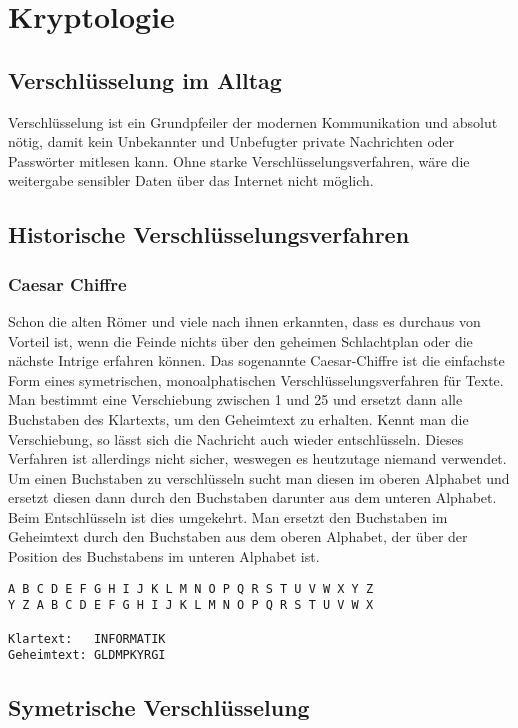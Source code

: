 \section{Kryptologie}
\subsection{Verschlüsselung im Alltag}

Verschlüsselung ist ein Grundpfeiler der modernen Kommunikation und absolut nötig,
damit kein Unbekannter und Unbefugter private Nachrichten oder Passwörter mitlesen
kann. Ohne starke Verschlüsselungsverfahren, wäre die weitergabe sensibler Daten über
das Internet nicht möglich.

\subsection{Historische Verschlüsselungsverfahren}

\subsubsection{Caesar Chiffre}

Schon die alten Römer und viele nach ihnen erkannten, dass es durchaus von Vorteil
ist, wenn die Feinde nichts über den geheimen Schlachtplan oder die nächste Intrige
erfahren können.
Das sogenannte Caesar-Chiffre ist die einfachste Form eines symetrischen,
monoalphatischen Verschlüsselungsverfahren für Texte.
Man bestimmt eine Verschiebung zwischen 1 und 25 und ersetzt dann
alle Buchstaben des Klartexts, um den Geheimtext zu erhalten.
Kennt man die Verschiebung, so lässt sich die Nachricht auch wieder entschlüsseln.
Dieses Verfahren ist allerdings nicht sicher, weswegen es heutzutage niemand verwendet.
Um einen Buchstaben zu verschlüsseln sucht man diesen im oberen Alphabet und
ersetzt diesen dann durch den Buchstaben darunter aus dem unteren Alphabet.
Beim Entschlüsseln ist dies umgekehrt. Man ersetzt den Buchstaben im Geheimtext
durch den Buchstaben aus dem oberen Alphabet, der über der Position des Buchstabens
im unteren Alphabet ist.

\begin{lstlisting}
A B C D E F G H I J K L M N O P Q R S T U V W X Y Z
Y Z A B C D E F G H I J K L M N O P Q R S T U V W X

Klartext:   INFORMATIK
Geheimtext: GLDMPKYRGI
\end{lstlisting}

\subsection{Symetrische Verschlüsselung}


